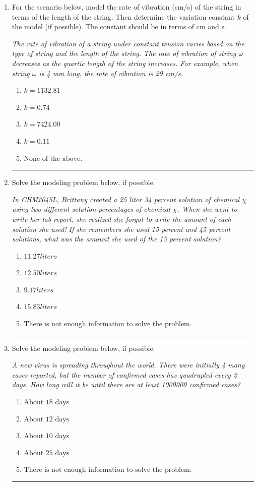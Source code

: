 \documentclass[14pt]{extbook}
\newcommand{\litem}[1]{\item#1\hspace*{-1cm}\rule{\textwidth}{0.4pt}}
\begin{document}
\begin{enumerate}
{\begin{enumerate}[label=\Alph*.]
\end{enumerate} }
\litem{
For the scenario below, model the rate of vibration (cm/s) of the string in terms of the length of the string. Then determine the variation constant $k$ of the model (if possible). The constant should be in terms of cm and s.
\begin{center}
    \textit{ The rate of vibration of a string under constant tension varies based on the type of string and the length of the string. The rate of vibration of string $\omega$ decreases as the quartic length of the string increases. For example, when string $\omega$ is 4 mm long, the rate of vibration is 29 cm/s. }
\end{center}
\begin{enumerate}[label=\Alph*.]
\item \( k = 1132.81 \)
\item \( k = 0.74 \)
\item \( k = 7424.00 \)
\item \( k = 0.11 \)
\item \( \text{None of the above.} \)

\end{enumerate} }
\litem{
Solve the modeling problem below, if possible.
\begin{center}
    \textit{ In CHM2045L, Brittany created a 25 liter 34 percent solution of chemical $\chi$ using two different solution percentages of chemical $\chi$. When she went to write her lab report, she realized she forgot to write the amount of each solution she used! If she remembers she used 15 percent and 45 percent solutions, what was the amount she used of the 15 percent solution? }
\end{center}
\begin{enumerate}[label=\Alph*.]
\item \( 11.27 liters \)
\item \( 12.50 liters \)
\item \( 9.17 liters \)
\item \( 15.83 liters \)
\item \( \text{There is not enough information to solve the problem.} \)

\end{enumerate} }
\litem{
Solve the modeling problem below, if possible.
\begin{center}
    \textit{ A new virus is spreading throughout the world. There were initially 4 many cases reported, but the number of confirmed cases has quadrupled every 2 days. How long will it be until there are at least 1000000 confirmed cases? }
\end{center}
\begin{enumerate}[label=\Alph*.]
\item \( \text{About } 18 \text{ days} \)
\item \( \text{About } 12 \text{ days} \)
\item \( \text{About } 10 \text{ days} \)
\item \( \text{About } 25 \text{ days} \)
\item \( \text{There is not enough information to solve the problem.} \)


\end{enumerate}}
\end{enumerate}
\end{document}
